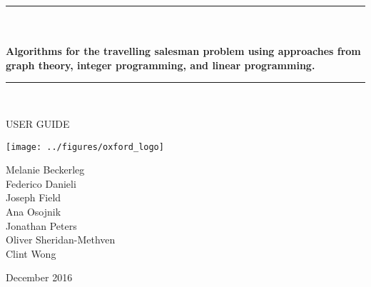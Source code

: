 \begin{center}
\begin{huge}
\rule{\linewidth}{1pt} \\	
\hfill \\	
\textbf{
Algorithms for the travelling salesman problem using approaches from graph theory, integer programming, and linear programming.
} \\ 
\rule{\linewidth}{1pt} \\
\end{huge}
\vspace{1cm}
\begin{huge}
USER GUIDE \\
\end{huge}
\vspace{1cm}
\texttt{[image: ../figures/oxford\_logo]} \\
\vspace{1cm}
\begin{Large}
\begin{multicols}{2}
Melanie Beckerleg \\
Federico Danieli \\
Joseph Field \\
Ana Osojnik \\
Jonathan Peters \\
Oliver Sheridan-Methven \\
Clint Wong \\
\end{multicols}
\vspace{1cm}
December 2016
\end{Large}
\end{center}
\clearpage